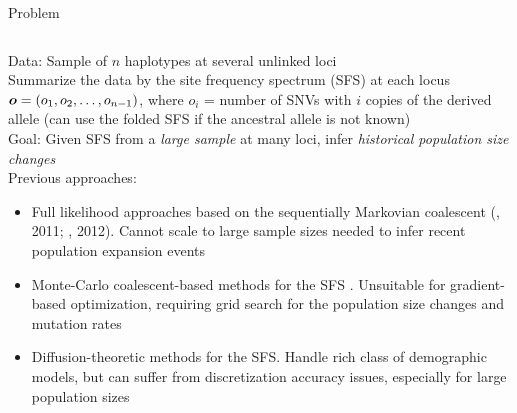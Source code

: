 \documentclass[final,hyperref={pdfpagelabels=false},professionalfonts,mathserif]{beamer}
\def\bfmath#1{\mathchoice
        {\mbox{\boldmath$#1$}}%
        {\mbox{\boldmath$#1$}}%
        {\mbox{\boldmath$\scriptstyle#1$}}%
        {\mbox{\boldmath$\scriptscriptstyle#1$}}}%
\def\bfo{\bfmath{o}}
\begin{document}
\begin{frame}[fragile]
\begin{columns}[t]
\begin{column}{.495\linewidth}
		\begin{block}{\large Problem} \justifying
			\begin{columns}[T]
			\begin{column}{.97\linewidth}
                \vspace{-0.5cm}
				Data: Sample of $n$ haplotypes at several unlinked loci \\
				Summarize the data by the site frequency spectrum (SFS) at each locus\\ $\bfo = (o_1, o_2, \ldots, o_{n-1})$, where $o_i$ = number of SNVs with $i$ copies of the derived allele (can use the folded SFS if the ancestral allele is not known) \\
				Goal: Given SFS from a \emph{large sample} at many loci, infer \emph{historical population size changes} \\
				Previous approaches:
				\begin{itemize}
					\item Full likelihood approaches based on the sequentially Markovian coalescent (\citeauthor{li:2011}, 2011; \citeauthor{sheehan:2013}, 2012). Cannot scale to large sample sizes needed to infer recent population expansion events
					\item Monte-Carlo coalescent-based methods for the SFS \citep{coventry:2010}. Unsuitable for gradient-based optimization, requiring grid search for the population size changes and mutation rates
					\item Diffusion-theoretic methods for the SFS. Handle rich class of demographic models, but can suffer from discretization accuracy issues, especially for large population sizes
				\end{itemize}
			\end{column}
			\end{columns}
		\end{block}



\end{column}
\end{columns}
\end{frame}
\end{document}
